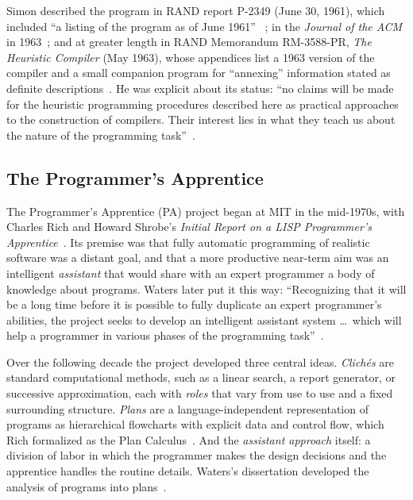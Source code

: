\documentclass[11pt]{article}
\begin{document}
Simon described the program in RAND report P-2349 (June 30, 1961),
which included ``a listing of the program as of June 1961''
~\cite{simonP2349}; in the \textit{Journal of the ACM} in
1963~\cite{simon1963jacm}; and at greater length in RAND Memorandum
RM-3588-PR, \textit{The Heuristic Compiler} (May 1963), whose
appendices list a 1963 version of the compiler and a small companion
program for ``annexing'' information stated as definite
descriptions~\cite{simonRM3588}. He was explicit about its status:
``no claims will be made for the heuristic programming procedures
described here as practical approaches to the construction of
compilers. Their interest lies in what they teach us about the nature
of the programming task''~\cite[p.~493]{simon1963jacm}.

\subsection{The Programmer's Apprentice}

The Programmer's Apprentice (PA) project began at MIT in the
mid-1970s, with Charles Rich and Howard Shrobe's \textit{Initial Report
on a LISP Programmer's Apprentice}~\cite{richshrobe1976}. Its premise
was that fully automatic programming of realistic software was a
distant goal, and that a more productive near-term aim was an
intelligent \emph{assistant} that would share with an expert
programmer a body of knowledge about programs. Waters later put it
this way: ``Recognizing that it will be a long time before it is
possible to fully duplicate an expert programmer's abilities, the
project seeks to develop an intelligent assistant system \ldots\ which
will help a programmer in various phases of the programming
task''~\cite[p.~47]{waters1986aimag}.

Over the following decade the project developed three central ideas.
\emph{Clich\'es} are standard computational methods, such as a linear
search, a report generator, or successive approximation, each with
\emph{roles} that vary from use to use and a fixed surrounding
structure. \emph{Plans} are a language-independent representation of
programs as hierarchical flowcharts with explicit data and control flow,
which Rich formalized as the Plan
Calculus~\cite{richwaters1987overview}. And the \emph{assistant
approach} itself: a division of labor in which the programmer makes the
design decisions and the apprentice handles the routine details.
Waters's dissertation developed the analysis of programs into
plans~\cite{waters1978}.
\end{document}
